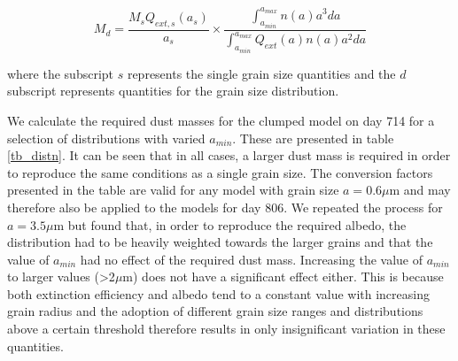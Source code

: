 \begin{equation}
\label{distn_conv}
M_{d}= \frac{M_s Q_{ext,s}(a_s)}{a_s} \times \frac{\int^{a_{max}}_{a_{min}} n(a) a^3 da}{\int^{a_{max}}_{a_{min}} Q_{ext}(a) n(a) a^2 da}
\end{equation}

where the subscript $s$ represents the single grain size quantities and the $d$ subscript represents quantities for the grain size distribution.  

We calculate the required dust masses for the clumped model on day 714 for a selection of distributions with varied $a_{min}$.  These are presented in table \ref{tb_distn}.  It can be seen that in all cases, a larger dust mass is required in order to reproduce the same conditions as a single grain size.  The conversion factors presented in the table are valid for any model with grain size $a=0.6\mu$m and may therefore also be applied to the models for day 806.  We repeated the process for $a=3.5 \mu$m but found that, in order to reproduce the required albedo, the distribution had to be heavily weighted towards the larger grains and that the value of $a_{min}$ had no effect of the required dust mass.  Increasing the value of $a_{min}$ to larger values (>2$\mu$m) does not have a significant effect either.  This is because both extinction efficiency and albedo tend to a constant value with increasing grain radius and the adoption of different grain size ranges and distributions above a certain threshold therefore results in only insignificant variation in these quantities. 

